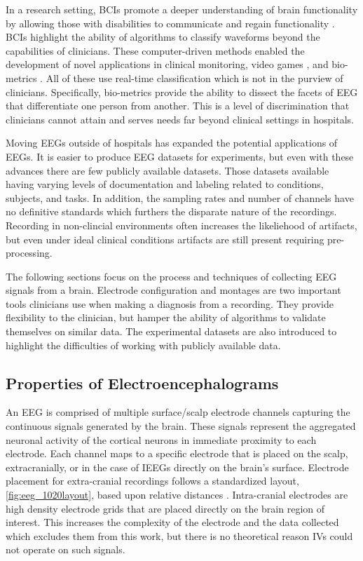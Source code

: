 In a research setting, \acp{BCI} promote a deeper understanding of brain functionality by allowing those with disabilities to communicate \cite{Picton1992} and regain functionality \cite{Ajiboye2017}. \acp{BCI} highlight the ability of algorithms to classify waveforms beyond the capabilities of clinicians. These computer-driven methods enabled the development of novel applications in clinical monitoring, video games \cite{Lance2012}, and bio-metrics \cite{Fazli2011a}. All of these use real-time classification which is not in the purview of clinicians. Specifically, bio-metrics provide the ability to dissect the facets of \ac{EEG} that differentiate one person from another. This is a level of discrimination that clinicians cannot attain and serves needs far beyond clinical settings in hospitals.

Moving \acp{EEG} outside of hospitals has expanded the potential applications of \acp{EEG}\cite{Liao2012}. It is easier to produce \ac{EEG} datasets for experiments, but even with these advances there are few publicly available datasets. Those datasets available having varying levels of documentation and labeling related to conditions, subjects, and tasks. In addition, the sampling rates and number of channels have no definitive standards which furthers the disparate nature of the recordings. Recording in non-clincial environments often increases the likeliehood of artifacts, but even under ideal clinical conditions artifacts are still present requiring pre-processing\cite{Mahajan2015,Nolan2010}.

The following sections focus on the process and techniques of collecting \ac{EEG} signals from a brain. Electrode configuration and montages are two important tools clinicians use when making a diagnosis from a recording. They provide flexibility to the clinician, but hamper the ability of algorithms to validate themselves on similar data. The experimental datasets are also introduced to highlight the difficulties of working with publicly available data.

\subsection{Properties of Electroencephalograms}

An \ac{EEG} is comprised of multiple surface/scalp electrode channels capturing the continuous signals generated by the brain. These signals represent the aggregated neuronal activity of the cortical neurons in immediate proximity to each electrode. Each channel maps to a specific electrode that is placed on the scalp, extracranially, or in the case of \acp{IEEG} directly on the brain's surface. Electrode placement for extra-cranial recordings follows a standardized layout, \cref{fig:eeg_1020layout}, based upon relative distances \cite{Jurcak2007}. Intra-cranial electrodes are high density electrode grids that are placed directly on the brain region of interest. This increases the complexity of the electrode and the data collected which excludes them from this work, but there is no theoretical reason \acp{IV} could not operate on such signals.

